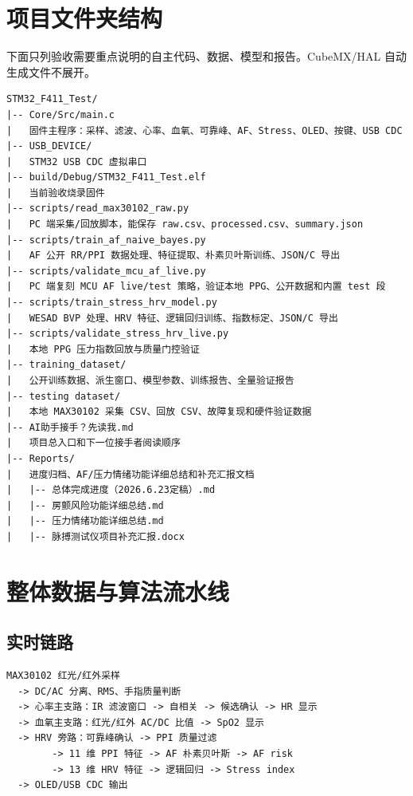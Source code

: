\documentclass[10.5pt,a4paper,UTF8]{ctexart}
\begin{document}
\section{项目文件夹结构}

下面只列验收需要重点说明的自主代码、数据、模型和报告。CubeMX/HAL 自动生成文件不展开。

\begin{lstlisting}
STM32_F411_Test/
|-- Core/Src/main.c
|   固件主程序：采样、滤波、心率、血氧、可靠峰、AF、Stress、OLED、按键、USB CDC
|-- USB_DEVICE/
|   STM32 USB CDC 虚拟串口
|-- build/Debug/STM32_F411_Test.elf
|   当前验收烧录固件
|-- scripts/read_max30102_raw.py
|   PC 端采集/回放脚本，能保存 raw.csv、processed.csv、summary.json
|-- scripts/train_af_naive_bayes.py
|   AF 公开 RR/PPI 数据处理、特征提取、朴素贝叶斯训练、JSON/C 导出
|-- scripts/validate_mcu_af_live.py
|   PC 端复刻 MCU AF live/test 策略，验证本地 PPG、公开数据和内置 test 段
|-- scripts/train_stress_hrv_model.py
|   WESAD BVP 处理、HRV 特征、逻辑回归训练、指数标定、JSON/C 导出
|-- scripts/validate_stress_hrv_live.py
|   本地 PPG 压力指数回放与质量门控验证
|-- training_dataset/
|   公开训练数据、派生窗口、模型参数、训练报告、全量验证报告
|-- testing dataset/
|   本地 MAX30102 采集 CSV、回放 CSV、故障复现和硬件验证数据
|-- AI助手接手？先读我.md
|   项目总入口和下一位接手者阅读顺序
|-- Reports/
|   进度归档、AF/压力情绪功能详细总结和补充汇报文档
|   |-- 总体完成进度（2026.6.23定稿）.md
|   |-- 房颤风险功能详细总结.md
|   |-- 压力情绪功能详细总结.md
|   |-- 脉搏测试仪项目补充汇报.docx
\end{lstlisting}

\section{整体数据与算法流水线}

\subsection{实时链路}

\begin{lstlisting}
MAX30102 红光/红外采样
  -> DC/AC 分离、RMS、手指质量判断
  -> 心率主支路：IR 滤波窗口 -> 自相关 -> 候选确认 -> HR 显示
  -> 血氧主支路：红光/红外 AC/DC 比值 -> SpO2 显示
  -> HRV 旁路：可靠峰确认 -> PPI 质量过滤
        -> 11 维 PPI 特征 -> AF 朴素贝叶斯 -> AF risk
        -> 13 维 HRV 特征 -> 逻辑回归 -> Stress index
  -> OLED/USB CDC 输出
\end{lstlisting}
\end{document}

